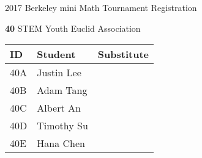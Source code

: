 \documentclass[12pt]{amsart}
\begin{document}
\newpage



\renewcommand{\TeamID}{40}
\renewcommand{\TeamName}{STEM}
\renewcommand{\SchoolName}{Youth Euclid Association}
\renewcommand{\IDA}{40A}
\renewcommand{\IDB}{40B}
\renewcommand{\IDC}{40C}
\renewcommand{\IDD}{40D}
\renewcommand{\IDE}{40E}
\renewcommand{\StudentA}{Justin Lee}
\renewcommand{\StudentB}{Adam Tang}
\renewcommand{\StudentC}{Albert An}
\renewcommand{\StudentD}{Timothy Su}
\renewcommand{\StudentE}{Hana Chen}

\begin{center}
{\sc \Large 2017 Berkeley mini Math Tournament Registration}

\bigskip
\bigskip

{\bf \Large  \TeamID} \hfill {\large \TeamName} \hfill {\large \SchoolName}

\bigskip
\bigskip

\begin{tabular}{| p{} | p{} | p{} |}
\hline
\bf ID         & \bf Student             & \bf Substitute             \\ \hline
\IDA           & \StudentA               &                            \\ \hline
\IDB           & \StudentB               &                            \\ \hline
\IDC           & \StudentC               &                            \\ \hline
\IDD           & \StudentD               &                            \\ \hline
\IDE           & \StudentE               &                            \\ \hline
\end{tabular} 
\end{center}
\bigskip
\bigskip

\newpage



\renewcommand{\TeamID}{41}
\renewcommand{\TeamName}{YEA-Diva}
\renewcommand{\SchoolName}{Youth Euclid Association}
\renewcommand{\IDA}{41A}
\renewcommand{\IDB}{41B}
\renewcommand{\IDC}{41C}
\renewcommand{\IDD}{41D}
\renewcommand{\IDE}{41E}
\renewcommand{\StudentA}{Selina Song}
\renewcommand{\StudentB}{Alice Zhu}
\renewcommand{\StudentC}{Carrie Mu}
\renewcommand{\StudentD}{Carolina Xue}
\renewcommand{\StudentE}{Mandy Liu}
\end{document}
